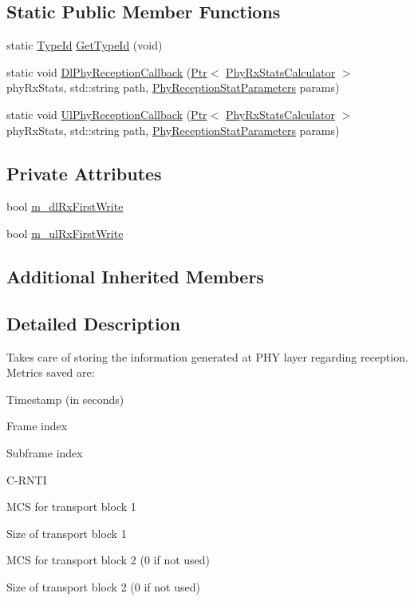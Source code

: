 \subsection*{Static Public Member Functions}
\begin{DoxyCompactItemize}
\item 
static \hyperlink{classns3_1_1TypeId}{Type\+Id} \hyperlink{classns3_1_1PhyRxStatsCalculator_a34e378bec2476f0edae2226d3f45a0ea}{Get\+Type\+Id} (void)
\item 
static void \hyperlink{classns3_1_1PhyRxStatsCalculator_acc451f528606482ad711733f4d4c2e18}{Dl\+Phy\+Reception\+Callback} (\hyperlink{classns3_1_1Ptr}{Ptr}$<$ \hyperlink{classns3_1_1PhyRxStatsCalculator}{Phy\+Rx\+Stats\+Calculator} $>$ phy\+Rx\+Stats, std\+::string path, \hyperlink{structns3_1_1PhyReceptionStatParameters}{Phy\+Reception\+Stat\+Parameters} params)
\item 
static void \hyperlink{classns3_1_1PhyRxStatsCalculator_a5a0293d4f51c4ed30d8b561763546d73}{Ul\+Phy\+Reception\+Callback} (\hyperlink{classns3_1_1Ptr}{Ptr}$<$ \hyperlink{classns3_1_1PhyRxStatsCalculator}{Phy\+Rx\+Stats\+Calculator} $>$ phy\+Rx\+Stats, std\+::string path, \hyperlink{structns3_1_1PhyReceptionStatParameters}{Phy\+Reception\+Stat\+Parameters} params)
\end{DoxyCompactItemize}
\subsection*{Private Attributes}
\begin{DoxyCompactItemize}
\item 
bool \hyperlink{classns3_1_1PhyRxStatsCalculator_a213f01bace4b066672eb60b4e394acf7}{m\+\_\+dl\+Rx\+First\+Write}
\item 
bool \hyperlink{classns3_1_1PhyRxStatsCalculator_a55444d2052b042d6541f412b6a0340f3}{m\+\_\+ul\+Rx\+First\+Write}
\end{DoxyCompactItemize}
\subsection*{Additional Inherited Members}


\subsection{Detailed Description}
Takes care of storing the information generated at P\+HY layer regarding reception. Metrics saved are\+:


\begin{DoxyItemize}
\item Timestamp (in seconds)
\item Frame index
\item Subframe index
\item C-\/\+R\+N\+TI
\item M\+CS for transport block 1
\item Size of transport block 1
\item M\+CS for transport block 2 (0 if not used)
\item Size of transport block 2 (0 if not used) 
\end{DoxyItemize}

